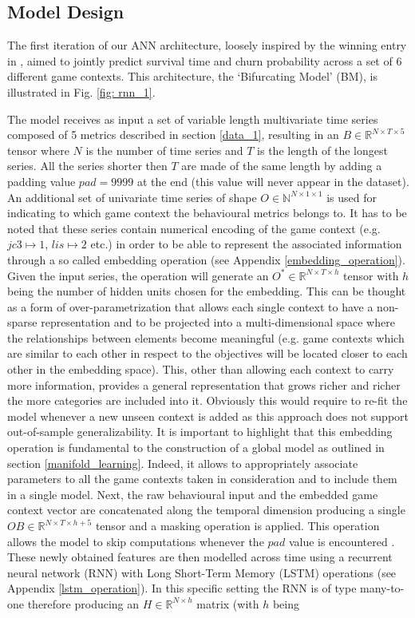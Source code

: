 \subsection{Model Design}
\label{model_design_1}
The first iteration of our ANN architecture, loosely inspired by the winning entry in \cite{lee2018game}, aimed to jointly predict survival time and churn probability across a set of 6 different game contexts. This architecture, the `Bifurcating Model' (BM), is illustrated in Fig. \ref{fig: rnn_1}. 

The model receives as input a set of variable length multivariate time series composed of 5 metrics described in section \ref{data_1}, resulting in an $B \in \mathbb{R}^{N \times T \times 5}$ tensor where $N$ is the number of time series and $T$ is the length of the longest series. All the series shorter then $T$ are made of the same length by adding a padding value $pad=9999$ at the end (this value will never appear in the dataset). An additional set of univariate time series of shape $O \in \mathbb{N}^{N \times 1 \times 1}$ is used for indicating to which game context the behavioural metrics belongs to.  It has to be noted that these series contain numerical encoding of the game context (e.g. $jc3 \mapsto 1$, $lis \mapsto 2$ etc.) in order to be able to represent the associated information through a so called embedding operation (see Appendix \ref{embedding_operation}). Given the input series, the operation will generate an $O^* \in \mathbb{R}^{N \times T \times h}$  tensor with $h$ being the number of hidden units chosen for the embedding. This can be thought as a form of over-parametrization that allows each single context to have a non-sparse representation and to be projected into a multi-dimensional space where the relationships between elements become meaningful (e.g. game contexts which are similar to each other in respect to the objectives will be located closer to each other in the embedding space). This, other than allowing each context to carry more information, provides a general representation that grows richer and richer the more categories are included into it. Obviously this would require to re-fit the model whenever a new unseen context is added as this approach does not support out-of-sample generalizability. It is important to highlight that this embedding operation is fundamental to the construction of a global model as outlined in section \ref{manifold_learning}. Indeed, it allows to appropriately associate parameters to all the game contexts taken in consideration and to include them in a single model. Next, the raw behavioural input and the embedded game context vector are concatenated along the temporal dimension producing a single $OB \in \mathbb{R}^{N \times T \times h + 5}$ tensor and a masking operation is applied. This operation allows the model to skip computations whenever the $pad$ value is encountered \cite{chollet2015keras}. These newly obtained features are then modelled across time using a recurrent neural network (RNN) with Long Short-Term Memory (LSTM) operations (see Appendix \ref{lstm_operation}). In this specific setting the RNN is of type many-to-one \cite{bengio2017deep} therefore producing an $H \in \mathbb{R}^{N \times h}$ matrix (with $h$ being 